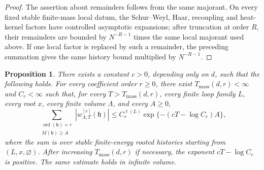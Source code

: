 \documentclass[11pt,a4paper,reqno]{amsart}
\newtheorem{proposition}[theorem]{Proposition}
\theoremstyle{definition}
\theoremstyle{remark}
\begin{document}
\begin{proof}
The assertion about remainders follows from the same majorant.  On every fixed stable finite-mass local datum, the Schur--Weyl, Haar, recoupling and heat-kernel factors have controlled asymptotic expansions; after truncation at order $R$, their remainders are bounded by $N^{-R-1}$ times the same local majorant used above.  If one local factor is replaced by such a remainder, the preceding summation gives the same history bound multiplied by $N^{-R-1}$.
\end{proof}


\begin{proposition}\label{prop:mass-sensitive-summability}
There exists a constant $c>0$, depending only on $d$, such that the following holds.  For every coefficient order $r\ge0$, there exist $T_{\mathrm{mass}}(d,r)<\infty$ and $C_r<\infty$ such that, for every $T>T_{\mathrm{mass}}(d,r)$, every finite loop family $L$, every root $x$, every finite volume $\Lambda$, and every $A\ge0$,
\begin{equation}\label{eq:mass-sensitive-summability}
\sum_{\substack{\operatorname{ord}(\mathfrak h)=r\\ M(\mathfrak h)\ge A}}
\left|w^{[r]}_{\Lambda,T}(\mathfrak h)\right|
\le C_r^{\ell(L)}\exp\{-(cT-\log C_r)A\},
\end{equation}
where the sum is over stable finite-energy rooted histories starting from $(L,x,\varnothing)$.  After increasing $T_{\mathrm{mass}}(d,r)$ if necessary, the exponent $cT-\log C_r$ is positive.  The same estimate holds in infinite volume.
\end{proposition}
\end{document}
